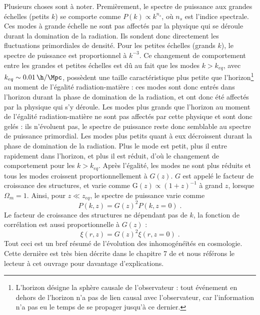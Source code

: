 \documentclass[11pt, twoside, a4paper, openright]{report}
\begin{document}
Plusieurs choses sont à noter. Premièrement, le spectre de puissance aux grandes échelles (petits $k$) se comporte comme $P(k) \propto k^{n_s}$, où $n_s$ est l'indice spectrale.
Ces modes à grande échelle ne sont pas affectés par la physique qui se déroule durant la domination de la radiation. Ils sondent donc directement les fluctuations primordiales de densité.
Pour les petites échelles (grands $k$), le spectre de puissance est proportionnel à $k^{-3}$. Ce changement de comportement entre les grandes et petites échelles est dû au fait que les modes $k > k_{eq}$, avec  $k_{eq} \sim \SI{0.01}{\h\per\Mpc}$, possèdent une taille caractéristique plus petite que l'horizon\footnote{L'horizon désigne la sphère causale de l'observateur : tout événement en dehors de l'horizon n'a pas de lien causal avec l'observateur, car l'information n'a pas eu le temps de se propager jusqu'à ce dernier.} au moment de l'égalité radiation-matière : ces modes sont donc entrés dans l'horizon durant la phase de domination de la radiation, et ont donc été affectés par la physique qui s'y déroule.
Les modes plus grands que l'horizon au moment de l'égalité radiation-matière ne sont pas affectés par cette physique et sont donc gelés : ils n'évoluent pas, le spectre de puissance reste donc semblable au spectre de puissance primordial.
Les modes plus petits quant à eux décroissent durant la phase de domination de la radiation. Plus le mode est petit, plus il entre rapidement dans l'horizon, et plus il est réduit, d'où le changement de comportement pour les $k > k_{eq}$. Après l'égalité, les modes ne sont plus réduits et tous les modes croissent proportionnellement à $G(z)$. 
$G$ est appelé le facteur de croissance des structures, et varie comme $\mathrm{G}(z) \propto (1+z)^{-1}$ à grand $z$, lorsque $\Omega_m = 1$. Ainsi, pour $z \ll z_{eq}$, le spectre de puissance varie comme
\begin{equation}
  \label{eq:pow_spec_vs_z}
  P(k,z) = G(z)^{2} P(k,z=0)  \; .
\end{equation}
Le facteur de croissance des structures ne dépendant pas de $k$, la fonction de corrélation est aussi proportionnelle à $G(z)$ :
\begin{equation}
  \label{eq:cf_vs_z}
  \xi(r, z) = G(z)^{2} \xi(r, z=0) \; .
\end{equation}
Tout ceci est un bref résumé de l'évolution des inhomogénéïtés en cosmologie. Cette dernière est très bien décrite dans le chapitre 7 de \textcite{Dodelson2003} et nous référons le lecteur à cet ouvrage pour davantage d'explications.
\end{document}
